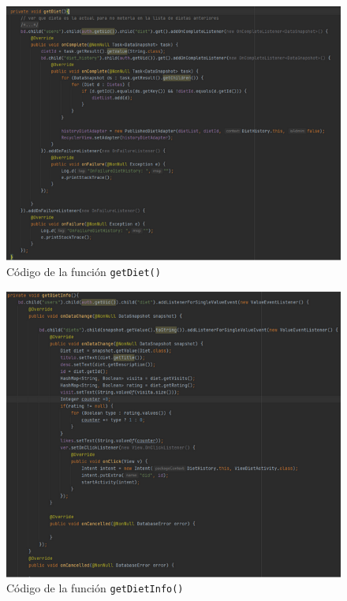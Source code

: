 \begin{figure}[H]
    \centering
    \includegraphics[width=\textwidth]{Images/Capitulo7/getdiet.png}
        \caption{Código de la función \texttt{getDiet()}}
    \label{fig:getdiet}
\end{figure}

\begin{figure}[H]
    \centering
    \includegraphics[width=\textwidth]{Images/Capitulo7/getdietinfo.png}
        \caption{Código de la función \texttt{getDietInfo()}}
    \label{fig:getdietinfo}
\end{figure}

